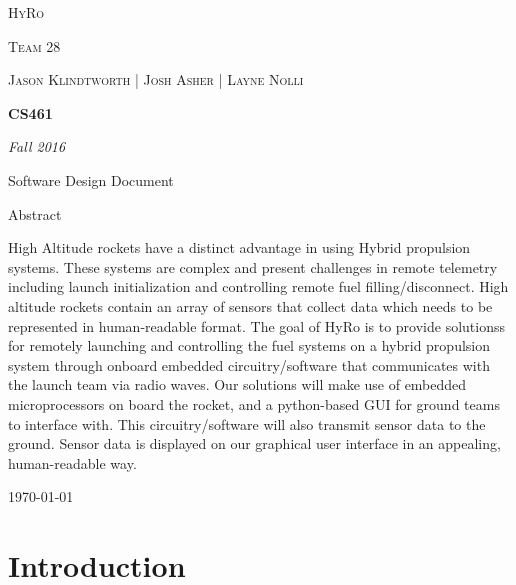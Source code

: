 \documentclass[10pt,draftclsnofoot,onecolumn,compsoc]{IEEEtran}
\begin{document}
\begin{titlepage}
	\centering
	{\scshape\LARGE HyRo \par}
	{\scshape\LARGE Team 28\par}
	\vspace{1cm}
	{\scshape\Large Jason Klindtworth  |  Josh Asher  |   Layne Nolli}
	\noindent\makebox[\linewidth]{\rule{17cm}{2pt}}
	\vspace{1cm}
	{\huge\bfseries CS461\par}
	\vspace{2cm}
	{\Large\itshape Fall 2016\par}
	\vspace{4cm}
	{\large Software Design Document\par}\vspace{2cm}
	{\large Abstract\par}
	\vspace{1cm}
	High Altitude rockets have a distinct advantage in using Hybrid propulsion systems. These systems are complex and present challenges in remote telemetry including launch initialization and controlling remote fuel filling/disconnect. High altitude rockets contain an array of sensors that collect data which needs to be represented in human-readable format. The goal of HyRo is to provide solutionss for remotely launching and controlling the fuel systems on a hybrid propulsion system through onboard embedded circuitry/software that communicates with the launch team via radio waves. Our solutions will make use of embedded microprocessors on board the rocket, and a python-based GUI for ground teams to interface with. This circuitry/software will also transmit sensor data to the ground. Sensor data is displayed on our graphical user interface in an appealing, human-readable way. \par

	\noindent\makebox[\linewidth]{\rule{17cm}{2pt}}
	\vfill

	{\large \today\par}
\end{titlepage}


\setcounter{tocdepth}{2}
\tableofcontents
\newpage

\section{Introduction}
\end{document}
